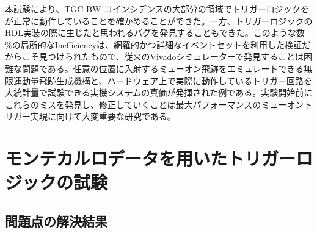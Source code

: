 本試験により、TGC BW コインシデンスの大部分の領域でトリガーロジックをが正常に動作していることを確かめることができた。一方、トリガーロジックのHDL実装の際に生じたと思われるバグを発見することもできた。このような数 \%の局所的なInefficiencyは、網羅的かつ詳細なイベントセットを利用した検証だからこそ見つけられたもので、従来のVivadoシミュレーターで発見することは困難な問題である。任意の位置に入射するミューオン飛跡をエミュレートできる無限運動量飛跡生成機構と、ハードウェア上で実際に動作しているトリガー回路を大統計量で試験できる実機システムの真価が発揮された例である。実験開始前にこれらのミスを発見し、修正していくことは最大パフォーマンスのミューオントリガー実現に向けて大変重要な研究である。


\section{モンテカルロデータを用いたトリガーロジックの試験}
\label{sec_SingleMuon}





\subsection{問題点の解決結果}


